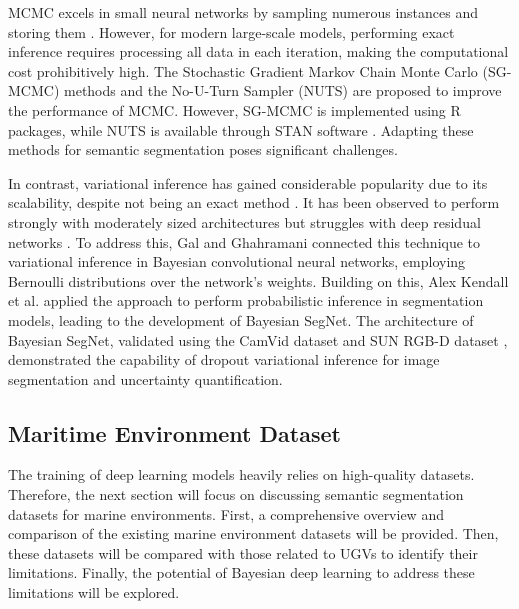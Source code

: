 MCMC excels in small neural networks by sampling numerous instances and storing them \cite{mcmc-bnn}. 
However, for modern large-scale models, performing exact inference requires processing all data in each iteration, 
making the computational cost prohibitively high. The Stochastic Gradient Markov Chain Monte Carlo (SG-MCMC) 
methods \cite{sgmcmc} and the No-U-Turn Sampler (NUTS) \cite{nuts} are proposed to improve the performance of MCMC. 
However, SG-MCMC is implemented using R packages, while NUTS is available through STAN software \cite{stan}. 
Adapting these methods for semantic segmentation poses significant challenges.

In contrast, variational inference has gained considerable popularity due to its scalability, despite not being 
an exact method \cite{bnn-tutorial}. It has been observed to perform strongly with moderately sized architectures 
but struggles with deep residual networks \cite{resnet}. To address this, Gal and Ghahramani \cite{VIdropout} 
connected this technique to variational inference in Bayesian convolutional neural networks, employing Bernoulli 
distributions over the network's weights. Building on this, Alex Kendall et al. \cite{bayesiansegnet} applied the 
approach to perform probabilistic inference in segmentation models, leading to the development of Bayesian SegNet. 
The architecture of Bayesian SegNet, validated using the CamVid dataset \cite{CamVid} and SUN RGB-D dataset 
\cite{sunrgbd}, demonstrated the capability of dropout variational inference for image segmentation and 
uncertainty quantification.

\subsection{Maritime Environment Dataset}
The training of deep learning models heavily relies on high-quality datasets. Therefore, the next section will 
focus on discussing semantic segmentation datasets for marine environments. First, a comprehensive overview and 
comparison of the existing marine environment datasets will be provided. Then, these datasets will be compared 
with those related to UGVs to identify their limitations. Finally, the potential of Bayesian deep learning to 
address these limitations will be explored.

